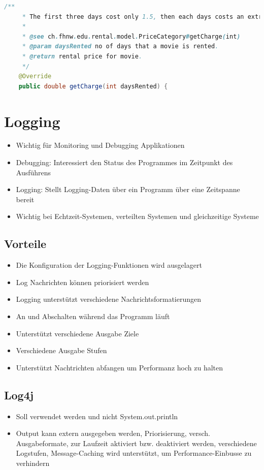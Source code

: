 \documentclass[a4paper,10pt]{article}
\begin{document}
\begin{lstlisting}[language=Java,caption=JavaDoc Beispiel 3, style=MyJavaStyle]
    /**
     * The first three days cost only 1.5, then each days costs an extra 1.5.
     * 
     * @see ch.fhnw.edu.rental.model.PriceCategory#getCharge(int)
     * @param daysRented no of days that a movie is rented.
     * @return rental price for movie.
     */
    @Override
    public double getCharge(int daysRented) {
\end{lstlisting}

\pagebreak
\section{Logging}
\begin{itemize}
	\item Wichtig f\"{u}r Monitoring und Debugging Applikationen
\item Debugging: Interessiert den Status des Programmes  im Zeitpunkt des Ausf\"{u}hrens
\item Logging: Stellt Logging-Daten \"{u}ber ein Programm \"{u}ber eine Zeitspanne bereit
\item Wichtig bei Echtzeit-Systemen, verteilten Systemen und gleichzeitige Systeme
\end{itemize}

\subsection{Vorteile}
\begin{itemize}
	\item Die Konfiguration der Logging-Funktionen wird ausgelagert
	\item Log Nachrichten k\"{o}nnen priorisiert werden
	\item Logging unterst\"{u}tzt verschiedene Nachrichtsformatierungen
	\item An und Abschalten w\"{a}hrend das Programm l\"{a}uft
	\item Unterst\"{u}tzt verschiedene Ausgabe Ziele
	\item Verschiedene Ausgabe Stufen
	\item Unterst\"{u}tzt Nachtrichten abfangen um Performanz hoch zu halten
\end{itemize}

\subsection{Log4j}
\begin{itemize}
\item Soll verwendet werden und nicht System.out.println
\item Output kann extern ausgegeben werden, Priorisierung, versch. Ausgabeformate, zur Laufzeit aktiviert bzw. deaktiviert werden, verschiedene Logstufen, Message-Caching wird unterst\"{u}tzt, um Performance-Einbusse zu verhindern
\end{itemize}
\end{document}
